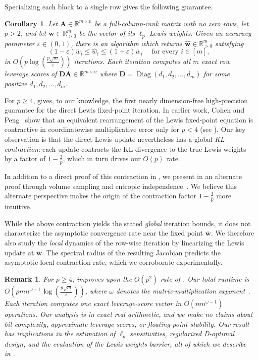 \documentclass[11pt]{article}
\theoremstyle{plain}
\newtheorem{corollary}[corollary]{Corollary}
\newtheorem{remark}[remark]{Remark}
\numberwithin{equation}{section}
\newcommand{\R}{\mathbb{R}}
\newcommand{\Diag}{\operatorname{Diag}}
\newcommand{\eps}{\varepsilon}
\newcommand{\Rmspos}{\mathbb{R}^m_{>0}}
\newcommand{\bA}{\mathbf{A}}
\newcommand{\bD}{\mathbf{D}}
\newcommand{\bwhat}{\widehat{\mathbf{w}}}
\newcommand{\bwbar}{\overline{\mathbf{w}}}
\newcommand{\what}{\widehat{w}}
\newcommand{\wbar}{\overline{w}}
\begin{document}
\noindent Specializing each block to a single row gives the following guarantee. 
\begin{corollary}
\label{cor:ordinary-main}
Let  $\bA\in\R^{m\times n}$ be a full-column-rank matrix with no zero rows, let $p>2$, and let $\bwbar\in\Rmspos$ be the vector of its $\ell_p$-Lewis weights. Given an accuracy parameter $\eps\in(0,1)$, there is an algorithm which returns $\bwhat\in\Rmspos$ satisfying
\[
  (1-\eps)\wbar_i
  \le \what_i
  \le (1+\eps)\wbar_i \quad
\text{ for every }i\in[m],
\]
in $O\left(
    p\log\left(\frac{p\sqrt{m}}{\eps}\right)
  \right)$ iterations. Each iteration computes all $m$ exact row leverage scores of $\bD\bA\in\R^{m\times n}$ where $\bD = \Diag\left(d_1, d_2, \dotsc, d_m\right)$ for some positive $d_1, d_2, \dotsc, d_m$. 
\end{corollary}
For $p\geq4$,  gives, to our knowledge, the first nearly dimension-free high-precision guarantee for the direct Lewis fixed-point iteration. 
In earlier work, Cohen and Peng~\cite{cohen2015lp} show that an equivalent rearrangement of the Lewis fixed-point equation is contractive in coordinatewise multiplicative error only for $p<4$ (see ). Our key observation is that the direct Lewis update nevertheless has a global \emph{KL contraction}: each update contracts the KL divergence to the true Lewis weights by a factor of $1-\frac{2}{p}$, which in turn drives our $\widetilde{O}(p)$ rate.

In addition to a direct proof of this contraction in , we  present in  an alternate proof through volume sampling and entropic independence~\cite{derezinski2021determinantal,anari2022entropic}. We believe this  alternate perspective  makes the origin of the contraction factor $1-\frac{2}{p}$ more intuitive.

While the above contraction yields the stated \emph{global} iteration bounds, it does not characterize the asymptotic convergence rate near the fixed point $\bwbar$.
We therefore also study the \emph{local} dynamics of the row-wise iteration by linearizing the Lewis update at $\bwbar$.
The spectral radius of the resulting Jacobian predicts the asymptotic local contraction rate, which we  corroborate experimentally. 

\begin{remark} For $p \geq4$,  improves upon the $\widetilde{O}(p^2)$ rate of \cite{pmlr-v336-gribling26a}. Our total runtime is $O\left(p mn^{\omega-1}\log\left(\frac{p\sqrt{m}}{\varepsilon}\right)\right)$, where $\omega$ denotes the matrix-multiplication exponent~\cite{huang1998fast, alman2025more}. Each iteration computes one exact leverage-score vector in $O(mn^{\omega-1})$ operations. Our analysis is in exact real arithmetic, and we make no claims about bit complexity, approximate leverage scores, or floating-point stability. Our result has implications in the estimation of $\ell_p$ sensitivities, regularized D-optimal design, and the evaluation of the Lewis weights barrier, all of which we describe in .
\end{remark} 
\end{document}
